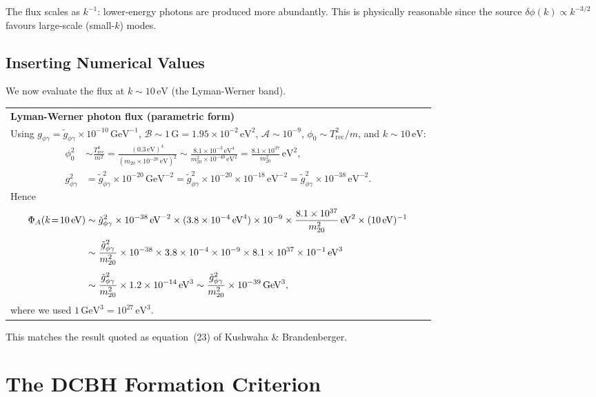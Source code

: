 \documentclass[12pt,a4paper]{report}
\newenvironment{keyresult}[1][Key Result]{%
  \par\medskip\noindent
  \begin{tabular}{|p{\dimexpr\linewidth-2\tabcolsep-2\arrayrulewidth\relax}|}
  \hline
  \textbf{#1}\\[2pt]
}{%
  \\ \hline
  \end{tabular}
  \par\medskip
}
\newcommand{\Trec}{T_{\mathrm{rec}}}
\newcommand{\gag}{g_{\phi\gamma}}
\newcommand{\gtag}{\tilde{g}_{\phi\gamma}}
\newcommand{\phizero}{\phi_0}
\theoremstyle{definition}
\begin{document}
The flux scales as $k^{-1}$: lower-energy photons are produced more abundantly.
This is physically reasonable since the source $\delta\phi(k)\propto k^{-3/2}$
favours large-scale (small-$k$) modes.

\section{Inserting Numerical Values}

We now evaluate the flux at $k\sim 10\,\mathrm{eV}$ (the Lyman-Werner band).

\begin{keyresult}[Lyman-Werner photon flux (parametric form)]
Using $\gag=\gtag\times 10^{-10}\,\mathrm{GeV}^{-1}$,
$\mathcal{B}\sim 1\,\mathrm{G}=1.95\times 10^{-2}\,\mathrm{eV}^2$,
$\mathcal{A}\sim 10^{-9}$, $\phizero\sim\Trec^2/m$, and $k\sim 10\,\mathrm{eV}$:
\begin{align}
  \phizero^2 &\sim \frac{\Trec^4}{m^2}
    = \frac{(0.3\,\mathrm{eV})^4}{(m_{20}\times 10^{-20}\,\mathrm{eV})^2}
    \sim \frac{8.1\times10^{-3}\,\mathrm{eV}^4}{m_{20}^2\times10^{-40}\,\mathrm{eV}^2}
    = \frac{8.1\times10^{37}}{m_{20}^2}\,\mathrm{eV}^2,\\[4pt]
  \gag^2 &= \gtag^2\times10^{-20}\,\mathrm{GeV}^{-2}
           = \gtag^2\times10^{-20}\times10^{-18}\,\mathrm{eV}^{-2}
           = \gtag^2\times10^{-38}\,\mathrm{eV}^{-2}.
\end{align}
Hence
\begin{align}
  \Phi_A(k\!=\!10\,\text{eV})
  &\sim \gtag^2\times10^{-38}\,\mathrm{eV}^{-2}
    \times(3.8\times10^{-4}\,\mathrm{eV}^4)
    \times10^{-9}
    \times\frac{8.1\times10^{37}}{m_{20}^2}\,\mathrm{eV}^2
    \times(10\,\mathrm{eV})^{-1}\notag\\[4pt]
  &\sim \frac{\gtag^2}{m_{20}^2}\times10^{-38}\times3.8\times10^{-4}
    \times10^{-9}\times8.1\times10^{37}\times10^{-1}\,\mathrm{eV}^3\notag\\[4pt]
  &\sim \frac{\gtag^2}{m_{20}^2}\times1.2\times10^{-14}\,\mathrm{eV}^3
    \sim \frac{\gtag^2}{m_{20}^2}\times10^{-39}\,\mathrm{GeV}^3,
  \label{eq:flux_numerical}
\end{align}
where we used $1\,\mathrm{GeV}^3 = 10^{27}\,\mathrm{eV}^3$.
\end{keyresult}

This matches the result quoted as equation~(23) of Kushwaha \& Brandenberger.

\chapter{The DCBH Formation Criterion}
\end{document}
